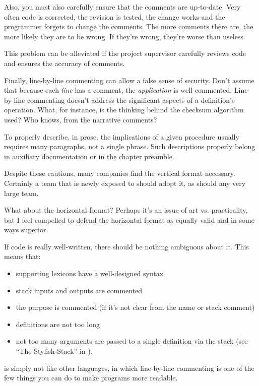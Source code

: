 Also, you must also carefully ensure that the comments are up-to-date.
Very often code is corrected, the revision is tested, the change
works-and the programmer forgets to change the comments.  The more
comments there are, the more likely they are to be wrong.  If they're
wrong, they're worse than useless.

This problem can be alleviated if the project supervisor carefully reviews
code and ensures the accuracy of comments.

Finally, line-by-line commenting can allow a false sense of security.
Don't assume that because each \emph{line} has a comment, the \emph{application} is
well-commented.  Line-by-line commenting doesn't address the significant
aspects of a definition's operation.  What, for instance, is the thinking
behind the checksum algorithm used? Who knows, from the narrative
comments?

To properly describe, in prose, the implications of a given procedure
usually requires many paragraphs, not a single phrase.  Such descriptions
properly belong in auxiliary documentation or in the chapter preamble.

Despite these cautions, many companies find the vertical format
necessary.  Certainly a team that is newly exposed to \Forth{} should
adopt it, as should any very large team.

What about the horizontal format? Perhaps it's an issue of art vs.
practicality, but I feel compelled to defend the horizontal format as equally
valid and in some ways superior.

If \Forth{} code is really well-written, there should be nothing ambiguous
about it.  This means that:
\begin{itemize}
\item supporting lexicons have a well-designed syntax
\item stack inputs and outputs are commented
\item the purpose is commented (if it's not clear from the name or stack comment)
\item definitions are not too long
\item not too many arguments are passed to a single definition via the stack (see
``The Stylish Stack'' in ).
\end{itemize}
\Forth{} is simply not like other languages, in which line-by-line
commenting is one of the few things you can do to make programs more
readable.

